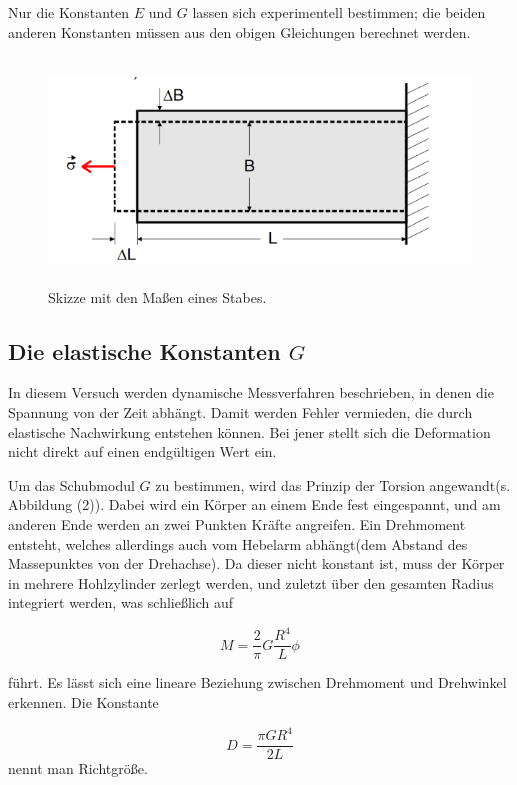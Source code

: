 Nur die Konstanten $E$ und $G$ lassen sich experimentell bestimmen; die beiden anderen Konstanten 
müssen aus den obigen Gleichungen berechnet werden. 

\begin{figure}[H]
 \centering
  \includegraphics[height=6cm]{Screenshot (7).png}
  \caption{Skizze mit den Maßen eines Stabes.\cite{kent}}
  \label{fig:drill}
\end{figure}


\subsection{Die elastische Konstanten $G$}

In diesem Versuch werden dynamische Messverfahren beschrieben, in denen die Spannung von der Zeit abhängt.
Damit werden Fehler vermieden, die durch elastische Nachwirkung entstehen können. Bei jener stellt sich die Deformation nicht direkt auf einen endgültigen Wert ein.

Um das Schubmodul $G$ zu bestimmen, wird das Prinzip der Torsion angewandt(s. Abbildung (2)).
Dabei wird ein Körper an einem Ende fest eingespannt, und am anderen Ende werden an zwei Punkten Kräfte angreifen.
Ein Drehmoment entsteht, welches allerdings auch vom Hebelarm abhängt(dem Abstand des Massepunktes von der Drehachse).
Da dieser nicht konstant ist, muss der Körper in mehrere Hohlzylinder zerlegt werden, und zuletzt über den gesamten Radius integriert werden, was  schließlich auf

\begin{equation}
  M = \frac{2}{\pi}G\frac{R^{4}}{L}\phi
\end{equation}

führt. Es lässt sich eine lineare Beziehung zwischen Drehmoment und Drehwinkel erkennen.
Die Konstante 

\begin{equation}
  D = \frac{\pi G R^{4}}{2L}
\end{equation}
nennt man Richtgröße.

